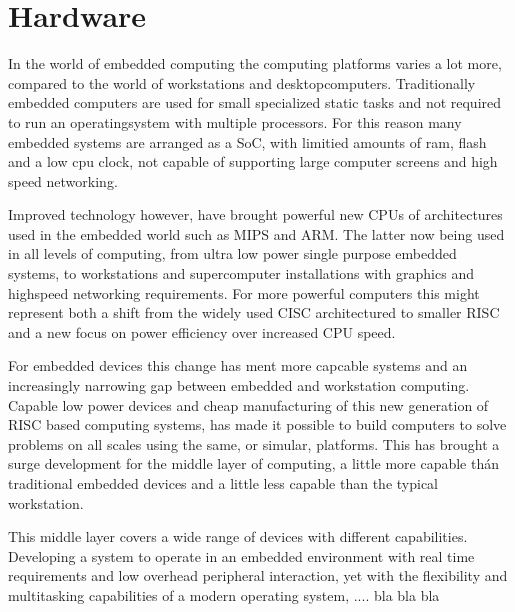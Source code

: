 \section{Hardware}
In the world of embedded computing the computing platforms varies a lot more,
compared to the world of workstations and desktopcomputers.
Traditionally embedded computers are used for small specialized static tasks and
not required to run an operatingsystem with multiple processors.
For this reason many embedded systems are arranged as a SoC,
with limitied amounts of ram, flash and a low cpu clock,
not capable of supporting large computer screens and high speed networking.

Improved technology however, have brought powerful new CPUs of architectures used in the embedded world
such as MIPS and ARM.
The latter now being used in all levels of computing, from ultra low power single purpose embedded systems,
to workstations and supercomputer installations with graphics and highspeed networking requirements.
For more powerful computers this might represent both a shift from the widely used CISC architectured
to smaller RISC and a new focus on power efficiency over increased CPU speed.

For embedded devices this change has ment more capcable systems
and an increasingly narrowing gap between embedded and workstation computing.
Capable low power devices and cheap manufacturing of this new generation of RISC based computing systems,
has made it possible to build computers to solve problems on all scales using the same, or simular, platforms.
This has brought a surge development for the middle layer of computing,
a little more capable thán traditional embedded devices and a little less capable than the typical workstation.

This middle layer covers a wide range of devices with different capabilities.
Developing a system to operate in an embedded environment with real time requirements
and low overhead peripheral interaction,
yet with the flexibility and multitasking capabilities of a modern operating system,
.... bla bla bla

\section{}

